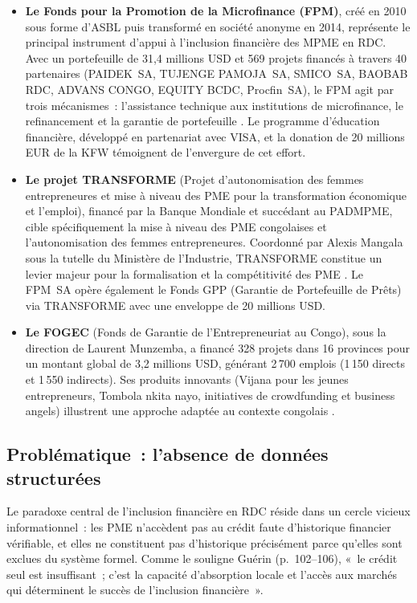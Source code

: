 \documentclass[12pt, a4paper, twocolumn]{article}
\begin{document}
\begin{itemize}[leftmargin=*]
  \item \textbf{Le Fonds pour la Promotion de la Microfinance (FPM)}, créé en 2010 sous forme d'ASBL puis transformé en société anonyme en 2014, représente le principal instrument d'appui à l'inclusion financière des MPME en RDC. Avec un portefeuille de 31,4 millions USD et 569 projets financés à travers 40 partenaires (PAIDEK~SA, TUJENGE PAMOJA~SA, SMICO~SA, BAOBAB RDC, ADVANS CONGO, EQUITY BCDC, Procfin~SA), le FPM agit par trois mécanismes~: l'assistance technique aux institutions de microfinance, le refinancement et la garantie de portefeuille \cite{fpm2024}. Le programme d'éducation financière, développé en partenariat avec VISA, et la donation de 20 millions EUR de la KFW témoignent de l'envergure de cet effort.

  \item \textbf{Le projet TRANSFORME} (Projet d'autonomisation des femmes entrepreneures et mise à niveau des PME pour la transformation économique et l'emploi), financé par la Banque Mondiale et succédant au PADMPME, cible spécifiquement la mise à niveau des PME congolaises et l'autonomisation des femmes entrepreneures. Coordonné par Alexis Mangala sous la tutelle du Ministère de l'Industrie, TRANSFORME constitue un levier majeur pour la formalisation et la compétitivité des PME \cite{transforme2024}. Le FPM~SA opère également le Fonds GPP (Garantie de Portefeuille de Prêts) via TRANSFORME avec une enveloppe de 20 millions USD.

  \item \textbf{Le FOGEC} (Fonds de Garantie de l'Entrepreneuriat au Congo), sous la direction de Laurent Munzemba, a financé 328 projets dans 16 provinces pour un montant global de 3,2 millions USD, générant 2\,700 emplois (1\,150 directs et 1\,550 indirects). Ses produits innovants (Vijana pour les jeunes entrepreneurs, Tombola nkita nayo, initiatives de crowdfunding et business angels) illustrent une approche adaptée au contexte congolais \cite{fogec2024}.
\end{itemize}

\subsection{Problématique~: l'absence de données structurées}
\label{subsec:problematique}

Le paradoxe central de l'inclusion financière en RDC réside dans un cercle vicieux informationnel~: les PME n'accèdent pas au crédit faute d'historique financier vérifiable, et elles ne constituent pas d'historique précisément parce qu'elles sont exclues du système formel. Comme le souligne Guérin \cite{guerin2015} (p.~102--106), «~le crédit seul est insuffisant~; c'est la capacité d'absorption locale et l'accès aux marchés qui déterminent le succès de l'inclusion financière~».
\end{document}

